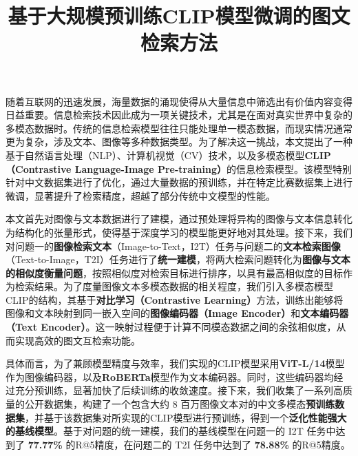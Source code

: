 \documentclass[a4paper]{zreport}
\title{基于大规模预训练CLIP模型微调的图文检索方法}
\begin{document}
\newpage

\vphantom{\Large hello}


\begingroup
{}

\vspace{3em}


\endgroup

\vspace{1em}

随着互联网的迅速发展，海量数据的涌现使得从大量信息中筛选出有价值内容变得日益重要。信息检索技术因此成为一项关键技术，尤其是在面对真实世界中复杂的多模态数据时。传统的信息检索模型往往只能处理单一模态数据，而现实情况通常更为复杂，涉及文本、图像等多种数据类型。为了解决这一挑战，本文提出了一种基于自然语言处理（NLP）、计算机视觉（CV）技术，以及多模态模型\textbf{CLIP（Contrastive Language-Image Pre-training）}的信息检索模型。该模型特别针对中文数据集进行了优化，通过大量数据的预训练，并在特定比赛数据集上进行微调，显著提升了检索精度，超越了部分传统中文模型的性能。

本文首先对图像与文本数据进行了建模，通过预处理将异构的图像与文本信息转化为结构化的张量形式，使得基于深度学习的模型能更好地对其处理。接下来，我们对问题一的\textbf{图像检索文本}（Image-to-Text，I2T）任务与问题二的\textbf{文本检索图像}（Text-to-Image，T2I）任务进行了\textbf{统一建模}，将两大检索问题转化为\textbf{图像与文本的相似度衡量问题}，按照相似度对检索目标进行排序，以具有最高相似度的目标作为检索结果。为了度量图像文本多模态数据的相关程度，我们引入多模态模型CLIP的结构，其基于\textbf{对比学习（Contrastive Learning）}方法，训练出能够将图像和文本映射到同一嵌入空间的\textbf{图像编码器（Image Encoder）}和\textbf{文本编码器（Text Encoder）}。这一映射过程便于计算不同模态数据之间的余弦相似度，从而实现高效的图文互检索功能。

具体而言，为了兼顾模型精度与效率，我们实现的CLIP模型采用\textbf{ViT-L/14}模型作为图像编码器，以及\textbf{RoBERTa}模型作为文本编码器。同时，这些编码器均经过充分预训练，显著加快了后续训练的收敛速度。接下来，我们收集了一系列高质量的公开数据集，构建了一个包含大约 8 百万图像文本对的中文多模态\textbf{预训练数据集}，并基于该数据集对所实现的CLIP模型进行预训练，得到一个\textbf{泛化性能强大的基线模型}。基于对问题的统一建模，我们的基线模型在问题一的 I2T 任务中达到了 \textbf{77.77\%} 的R@5精度，在问题二的 T2I 任务中达到了 \textbf{78.88\%} 的R@5精度。
\end{document}
